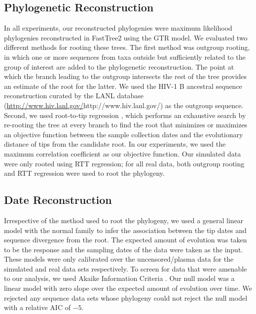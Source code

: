 \documentclass[12pt]{article}
\begin{document}
\subsection * {Phylogenetic Reconstruction} \label{subsec:phylo}
In all experiments, our reconstructed phylogenies were maximum likelihood phylogenies reconstructed in FastTree2 using the GTR model.
We evaluated two different methods for rooting these trees. 
The first method was outgroup rooting, in which one or more sequences from taxa outside but sufficiently related to the group of interest are added to the phylogenetic reconstruction.
The point at which the branch leading to the outgroup intersects the rest of the tree provides an estimate of the root for the latter.
We used the HIV-1 B ancestral sequence reconstruction curated by the LANL database (\url{http://www.hiv.lanl.gov/}{http://www.hiv.lanl.gov/}) as the outgroup sequence.
Second, we used root-to-tip regression \citep[RTT;][]{Korber00}, which performs an exhaustive search by re-rooting the tree at every branch to find the root that minimizes or maximizes an objective function between the sample collection dates and the evolutionary distance of tips from the candidate root.
In our experiments, we used the maximum correlation coefficient as our objective function.
Our simulated data were only rooted using RTT regression; for all real data, both outgroup rooting and RTT regression were used to root the phylogeny.


\subsection * {Date Reconstruction} \label{subsec:daterecon}

Irrespective of the method used to root the phylogeny, we used a general linear model with the normal family to infer the association between the tip dates and sequence divergence from the root. 
The expected amount of evolution was taken to be the response and the sampling dates of the data were taken as the input. 
These models were only calibrated over the uncensored/plasma data for the simulated and real data sets respectively.
To screen for data that were amenable to our analysis, we used Akaike Information Criteria \cite[AIC;][]{Akaike74}.
Our null model was a linear model with zero slope over the expected amount of evolution over time.
We rejected any sequence data sets whose phylogeny could not reject the null model with a relative AIC of ${-5}$.
\end{document}

